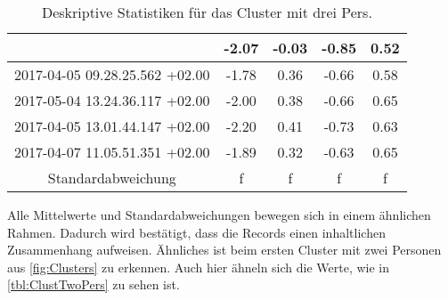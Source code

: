 \begin{center}
\begin{table}[ht]
\begin{tabular}{ |c|c|c|c|c| }
     & -2.07
     & -0.03
     & -0.85
     & 0.52 \\
     \hline
     2017-04-05 09.28.25.562 +02.00
     & -1.78
     & 0.36
     & -0.66
     & 0.58 \\
     \hline
     2017-05-04 13.24.36.117 +02.00
     & -2.00
     & 0.38
     & -0.66
     & 0.65 \\
     \hline
     2017-04-05 13.01.44.147 +02.00
     & -2.20
     & 0.41
     & -0.73
     & 0.63 \\
     \hline
     2017-04-07 11.05.51.351 +02.00
     & -1.89
     & 0.32
     & -0.63
     & 0.65 \\
     \hline
     \hline
     Standardabweichung
     & f
     & f
     & f
     & f \\
     \hline
    \end{tabular}
    \caption{Deskriptive Statistiken für das Cluster mit drei Pers.}
    \label{tbl:ClustThreePers}
    \end{table}
  \end{center}
  Alle Mittelwerte und Standardabweichungen bewegen sich in einem ähnlichen Rahmen.
  Dadurch wird bestätigt, dass die Records einen inhaltlichen Zusammenhang aufweisen.
  Ähnliches ist beim ersten Cluster mit zwei Personen aus \autoref{fig:Clusters} zu erkennen.
  Auch hier ähneln sich die Werte, wie in \autoref{tbl:ClustTwoPers} zu sehen ist.
